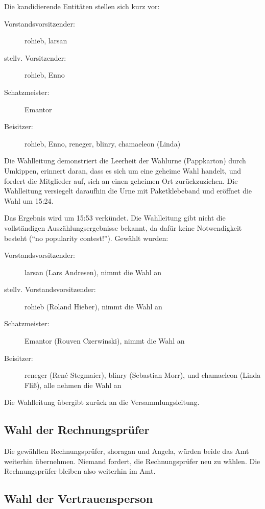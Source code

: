 \documentclass{s0minutes}
\begin{document}
Die kandidierende Entitäten stellen sich kurz vor:
\begin{description}
  \item[Vorstandsvorsitzender:] rohieb, larsan
  \item[stellv. Vorsitzender:] rohieb, Enno
  \item[Schatzmeister:] Emantor
  \item[Beisitzer:] rohieb, Enno, reneger, blinry, chamaeleon (Linda)
\end{description}

Die Wahlleitung demonstriert die Leerheit der Wahlurne (Pappkarton) durch
Umkippen, erinnert daran, dass es sich um eine geheime Wahl handelt, und fordert
die Mitglieder auf, sich an einen geheimen Ort zurückzuziehen. Die Wahlleitung
versiegelt daraufhin die Urne mit Paketklebeband und eröffnet die Wahl um 15:24.


Das Ergebnis wird um 15:53 verkündet. Die Wahlleitung gibt nicht die
vollständigen Auszählungsergebnisse bekannt, da dafür keine Notwendigkeit
besteht ("`no popularity contest!"'). Gewählt wurden:

\begin{description}
  \item[Vorstandsvorsitzender:] larsan (Lars Andresen), nimmt die Wahl an
  \item[stellv. Vorstandsvorsitzender:] rohieb (Roland Hieber), nimmt die Wahl
    an
  \item[Schatzmeister:] Emantor (Rouven Czerwinski), nimmt die Wahl an
  \item[Beisitzer:] reneger (René Stegmaier), blinry (Sebastian Morr), und
    chamaeleon (Linda Fliß), alle nehmen die Wahl an
\end{description}

Die Wahlleitung übergibt zurück an die Versammlungsleitung.

\subsection{Wahl der Rechnungsprüfer}

Die gewählten Rechnungsprüfer, shoragan und Angela, würden beide das Amt
weiterhin übernehmen. Niemand fordert, die Rechnungsprüfer neu zu wählen.
Die Rechnungsprüfer bleiben also weiterhin im Amt.

\subsection{Wahl der Vertrauensperson}
\end{document}
